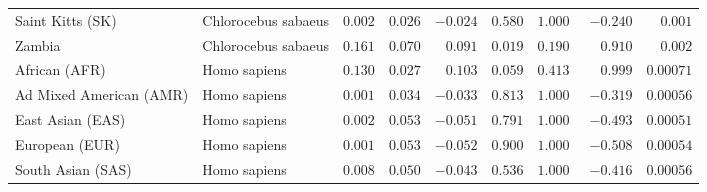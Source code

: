 \begin{center}
\begin{adjustbox}{width = 1\textwidth}
\begin{tabular}{|l|l|r|r|r|r|r|r|r|}
            Saint Kitts (SK)                  & Chlorocebus sabaeus        & $ 0.002$ & $ 0.026$  & $-0.024$ & $ 0.580$ & $ 1.000~~$     & $-0.240$ & $ 0.001$ \\
            Zambia        & Chlorocebus sabaeus        & $ 0.161$ & $ 0.070$  & $ 0.091$ & $ 0.019$ & $ 0.190~~$ & $ 0.910$ & $ 0.002$ \\
            African (AFR)               & Homo sapiens        & $ 0.130$ & $ 0.027$  & $ 0.103$ & $ 0.059$ & $ 0.413~~$     & $ 0.999$ & $0.00071$ \\
            Ad Mixed American (AMR)                 & Homo sapiens        & $ 0.001$ & $ 0.034$  & $-0.033$ & $ 0.813$ & $ 1.000~~$     & $-0.319$ & $0.00056$ \\
            East Asian (EAS)              & Homo sapiens        & $ 0.002$ & $ 0.053$  & $-0.051$ & $ 0.791$ & $ 1.000~~$     & $-0.493$ & $0.00051$ \\
            European (EUR)              & Homo sapiens        & $ 0.001$ & $ 0.053$  & $-0.052$ & $ 0.900$ & $ 1.000~~$     & $-0.508$ & $0.00054$ \\
            South Asian (SAS)              & Homo sapiens        & $ 0.008$ & $ 0.050$  & $-0.043$ & $ 0.536$ & $ 1.000~~$     & $-0.416$ & $0.00056$ \\
            \bottomrule
        \end{tabular}
    \end{adjustbox}
    \newpage
\end{center}

